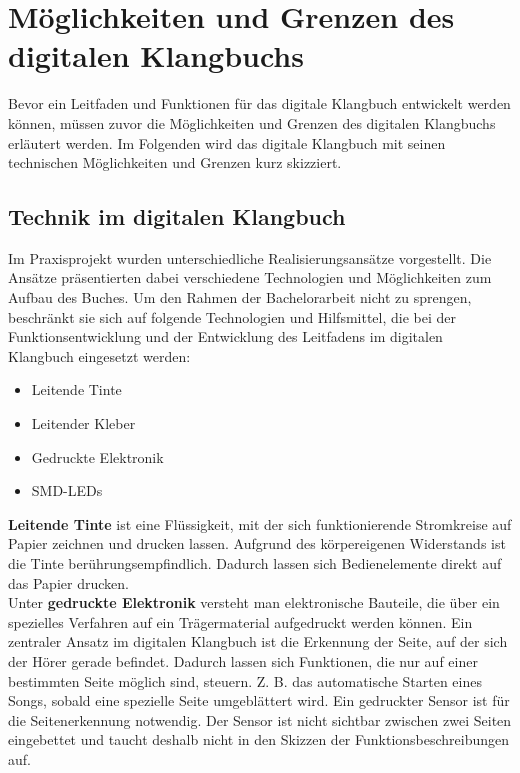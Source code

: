 

\chapter{Möglichkeiten und Grenzen des digitalen Klangbuchs}\label{moeglichkeiten}

Bevor ein Leitfaden und Funktionen für das digitale Klangbuch entwickelt werden können, müssen zuvor die Möglichkeiten und Grenzen des digitalen Klangbuchs erläutert werden. Im Folgenden wird das digitale Klangbuch mit seinen technischen Möglichkeiten und Grenzen kurz skizziert.



\section{Technik im digitalen Klangbuch}

Im Praxisprojekt wurden unterschiedliche Realisierungsansätze vorgestellt. Die Ansätze präsentierten dabei verschiedene Technologien und Möglichkeiten zum Aufbau des Buches. Um den Rahmen der Bachelorarbeit nicht zu sprengen, beschränkt sie sich auf folgende Technologien und Hilfsmittel, die bei der Funktionsentwicklung und der Entwicklung des Leitfadens im digitalen Klangbuch eingesetzt werden:


\begin{itemize}
\item{Leitende Tinte}
\item{Leitender Kleber}
\item{Gedruckte Elektronik}
\item{SMD-LEDs}
\end{itemize}

\textbf{Leitende Tinte} ist eine Flüssigkeit, mit der sich funktionierende Stromkreise auf Papier zeichnen und drucken lassen. Aufgrund des körpereigenen Widerstands ist die Tinte berührungsempfindlich. Dadurch lassen sich Bedienelemente direkt auf das Papier drucken.\\

Unter \textbf{gedruckte Elektronik} versteht man elektronische Bauteile, die über ein spezielles Verfahren auf ein Trägermaterial aufgedruckt werden können. Ein zentraler Ansatz im digitalen Klangbuch ist die Erkennung der Seite, auf der sich der Hörer gerade befindet. Dadurch lassen sich Funktionen, die nur auf einer bestimmten Seite möglich sind, steuern. Z. B. das automatische Starten eines Songs, sobald eine spezielle Seite umgeblättert wird. Ein gedruckter Sensor ist für die Seitenerkennung notwendig. Der Sensor ist nicht sichtbar zwischen zwei Seiten eingebettet und taucht deshalb nicht in den Skizzen der Funktionsbeschreibungen auf.\\


